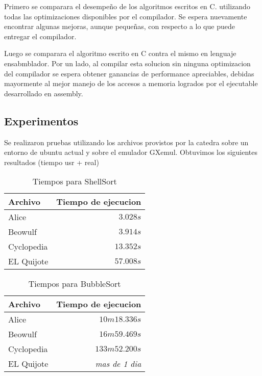 \documentclass[a4paper,11pt]{article}
\begin{document}
  Primero se comparara el desempeño de los algoritmos escritos en C. utilizando
  todas las optimizaciones disponibles por el compilador. Se espera nuevamente
  encontrar algunas mejoras, aunque pequeñas, con respecto a lo que puede
  entregar el compilador.

  Luego se comparara el algoritmo escrito en C contra el mismo en lenguaje ensabmblador.
  Por un lado, al compilar esta solucion sin ninguna optimizacion del compilador
  se espera obtener ganancias de performance apreciables, debidas mayormente al
  mejor manejo de los accesos a memoria logrados por el ejecutable desarrollado
  en assembly.

\subsection{Experimentos}

  Se realizaron pruebas utilizando los archivos provistos por la catedra sobre un
  entorno de ubuntu actual y sobre el emulador GXemul.
  Obtuvimos los siguientes resultados (tiempo usr + real)

\FloatBarrier

\begin{table}[h!t]
\centering
\begin{tabular}{| l | r |}
  \hline
  Archivo           & Tiempo de ejecucion \\ \hline
  Alice             & \(3.028s\) \\
  Beowulf           & \(3.914s\) \\
  Cyclopedia        & \(13.352s\) \\
  EL Quijote        & \(57.008s\) \\
  \hline
\end{tabular}

\caption{Tiempos para ShellSort}
\label{tab:resultados}
\end{table}

\FloatBarrier

\begin{table}[h!t]
\centering
\begin{tabular}{| l | r |}
  \hline
  Archivo           & Tiempo de ejecucion \\ \hline
  Alice             & \(10m18.336s\) \\
  Beowulf           & \(16m59.469s\) \\
  Cyclopedia        & \(133m52.200s\) \\
  EL Quijote        & \textit{mas de 1 dia} \\
  \hline
\end{tabular}
\caption{Tiempos para BubbleSort}
\label{tab:resultados}
\end{table}
\end{document}
